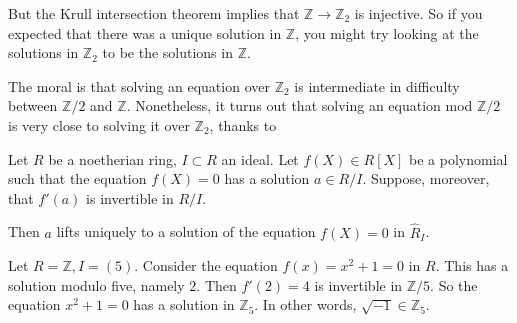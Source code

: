 But the Krull intersection theorem implies that $\mathbb{Z} \to \mathbb{Z}_2$
is injective. So if you expected that there was a unique solution in
$\mathbb{Z}$, you might try looking at the solutions in $\mathbb{Z}_2$ to be
the solutions in $\mathbb{Z}$.



The moral is that solving an equation over $\mathbb{Z}_2$ is intermediate in
difficulty between $\mathbb{Z}/2$ and $\mathbb{Z}$. Nonetheless, it turns out
that solving an equation mod $\mathbb{Z}/2$ is very close to solving it over
$\mathbb{Z}_2$, thanks to

\begin{theorem}
Let $R$ be a noetherian ring, $I \subset R$ an ideal. Let $f(X) \in R[X]$ be a
polynomial such that the equation $f(X)=0$ has a solution $ a \in R/I$.
Suppose, moreover, that $f'(a)$ is invertible in $R/I$. 

Then $a$ lifts uniquely to a solution of the equation $f(X) = 0$ in $\hat{R}_I$.
\end{theorem} 

\begin{example} 
Let $R = \mathbb{Z}, I = (5)$. Consider the equation $f(x) = x^2 + 1 = 0$ in $R$. This
has a solution modulo five, namely $2$. Then $f'(2) = 4$ is invertible in
$\mathbb{Z}/5$. So the equation $x^2 + 1 = 0$ has a solution in $\mathbb{Z}_5$.
In other words, $\sqrt{-1} \in \mathbb{Z}_5$.
\end{example} 

